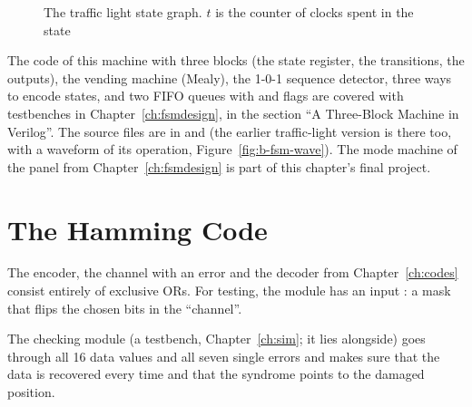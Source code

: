 \begin{figure}[H]
\centering
{}
\caption{The traffic light state graph. $t$ is the counter of clocks spent in the state}
\label{fig:b-fsm-graph}
\end{figure}

The code of this machine with three blocks (the state register, the transitions,
the outputs), the vending machine (Mealy), the 1-0-1 sequence detector, three
ways to encode states, and two FIFO queues with  and 
flags are covered with testbenches in Chapter~\ref{ch:fsmdesign}, in the section
``A Three-Block Machine in Verilog''. The source files are in
 and  (the earlier traffic-light
version  is there too, with a waveform of its operation,
Figure~\ref{fig:b-fsm-wave}). The mode machine of the panel from
Chapter~\ref{ch:fsmdesign} is part of this chapter's final project.

\section{The Hamming Code}

The encoder, the channel with an error and the decoder from Chapter~\ref{ch:codes} consist entirely of
exclusive ORs. For testing, the module has an input : a mask
that flips the chosen bits in the ``channel''.



The checking module  (a testbench, Chapter~\ref{ch:sim}; it lies
alongside) goes through all 16
data values and all seven single errors and makes sure that the data is recovered every
time and that the syndrome points to the damaged position.

